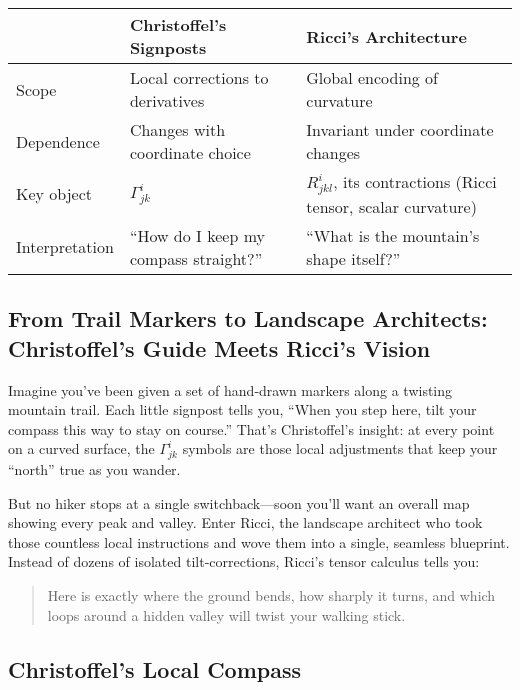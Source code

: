 \begin{tcolorbox}[colback=gray!5!white, colframe=black, title=\textbf{Sidebar: Christoffel’s Signposts vs.\ Ricci’s Architecture}, fonttitle=\bfseries, arc=1.5mm, boxrule=0.4pt]
\begin{tabular}{p{4cm} p{5.5cm} p{5.5cm}}
 & \textbf{Christoffel’s Signposts} & \textbf{Ricci’s Architecture} \\
\midrule
Scope & Local corrections to derivatives & Global encoding of curvature \\
Dependence & Changes with coordinate choice & Invariant under coordinate changes \\
Key object & \(\Gamma^i_{jk}\) & \(R^i_{jkl}\), its contractions (Ricci tensor, scalar curvature) \\
Interpretation & “How do I keep my compass straight?” & “What is the mountain’s shape itself?” \\
\end{tabular}
\end{tcolorbox}

\subsection{From Trail Markers to Landscape Architects: Christoffel’s Guide Meets Ricci’s Vision}

Imagine you’ve been given a set of hand‐drawn markers along a twisting mountain trail.  Each little signpost tells you, “When you step here, tilt your compass this way to stay on course.”  That’s Christoffel’s insight: at every point on a curved surface, the \(\Gamma^i_{jk}\) symbols are those local adjustments that keep your “north” true as you wander.

But no hiker stops at a single switchback—soon you’ll want an overall map showing every peak and valley.  Enter Ricci, the landscape architect who took those countless local instructions and wove them into a single, seamless blueprint.  Instead of dozens of isolated tilt‐corrections, Ricci’s tensor calculus tells you:

\begin{quote}
Here is exactly where the ground bends, how sharply it turns, and which loops around a hidden valley will twist your walking stick.
\end{quote}

\subsection{Christoffel’s Local Compass}

